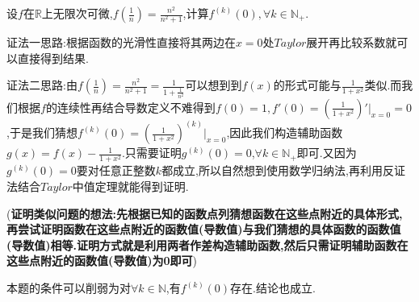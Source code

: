 \documentclass[lang=cn,newtx,10pt,scheme=chinese]{elegantbook}
\begin{document}
\begin{exercise}
    设\(f\)在\(\mathbb{R}\)上无限次可微,\(f\left(\frac{1}{n}\right)=\frac{n^{2}}{n^{2}+1}\),计算\(f^{(k)}(0), \forall k \in \mathbb{N}_{+}\).
\end{exercise}
\begin{note}
    {\color{blue}证法一思路:}根据函数的光滑性直接将其两边在$x=0$处$Taylor$展开再比较系数就可以直接得到结果.

    {\color{blue}证法二思路:}由$f\left( \frac{1}{n} \right) =\frac{n^2}{n^2+1}=\frac{1}{1+\frac{1}{n^2}}$可以想到到$f(x)$的形式可能与$\frac{1}{1+x^2}$类似.而我们根据$f$的连续性再结合导数定义不难得到$f(0)=1,f'(0)=(\frac{1}{1+x^2})'\Big|_{x = 0}=0$,于是我们猜想$f^{(k)}(0) = (\frac{1}{1 + x^2})^{(k)}\Big|_{x = 0}$,因此我们构造辅助函数\(g(x) = f(x) - \frac{1}{1 + x^2}\).只需要证明\(g^{(k)}(0) = 0\),\(\forall k\in \mathbb{N}_+\)即可.又因为\(g^{(k)}(0) = 0\)要对任意正整数$k$都成立,所以自然想到使用数学归纳法,再利用反证法结合$Taylor$中值定理就能得到证明.

    (\textbf{证明类似问题的想法:先根据已知的函数点列猜想函数在这些点附近的具体形式,再尝试证明函数在这些点附近的函数值(导数值)与我们猜想的具体函数的函数值(导数值)相等.证明方式就是利用两者作差构造辅助函数,然后只需证明辅助函数在这些点附近的函数值(导数值)为0即可})
\end{note}
\begin{remark}
    本题的条件可以削弱为对$\forall k\in \mathbb{N}$,有$f^{(k)}(0)$存在.结论也成立.
\end{remark}
\end{document}
